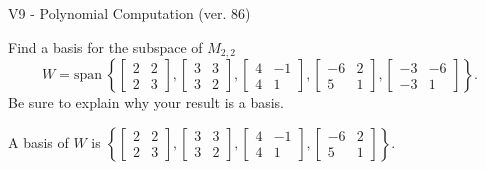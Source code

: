 \begin{exercise}
  \begin{exerciseTitle}V9 - Polynomial Computation (ver. 86)\end{exerciseTitle}
  \begin{exerciseStatement}
    Find a basis for the subspace of \(M_{2,2}\) 
\[W=\mathrm{span}\ \left\{\left[\begin{array}{cc}
2 & 2 \\
2 & 3
\end{array}\right] , \left[\begin{array}{cc}
3 & 3 \\
3 & 2
\end{array}\right] , \left[\begin{array}{cc}
4 & -1 \\
4 & 1
\end{array}\right] , \left[\begin{array}{cc}
-6 & 2 \\
5 & 1
\end{array}\right] , \left[\begin{array}{cc}
-3 & -6 \\
-3 & 1
\end{array}\right]\right\}.\]
 Be sure to explain why your result is a basis.


  \end{exerciseStatement}
  \begin{exerciseAnswer}
   A basis of \(W\) is  \(\left\{\left[\begin{array}{cc}
2 & 2 \\
2 & 3
\end{array}\right] , \left[\begin{array}{cc}
3 & 3 \\
3 & 2
\end{array}\right] , \left[\begin{array}{cc}
4 & -1 \\
4 & 1
\end{array}\right] , \left[\begin{array}{cc}
-6 & 2 \\
5 & 1
\end{array}\right]\right\}\).
  


  \end{exerciseAnswer}
\end{exercise}